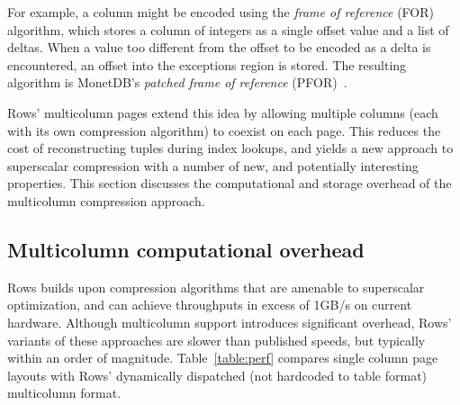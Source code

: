 \documentclass{sig-alternate-sigmod08}
\newcommand{\rows}{Rows\xspace}
\newcommand{\rowss}{Rows'\xspace}
\begin{document}
For example, a column might be encoded using the {\em frame of
  reference} (FOR) algorithm, which stores a column of integers as a
single offset value and a list of deltas.  When a value too different
from the offset to be encoded as a delta is encountered, an offset
into the exceptions region is stored.  The resulting algorithm is MonetDB's
 {\em patched frame of reference} (PFOR)~\cite{pfor}.

\rowss multicolumn pages extend this idea by allowing multiple columns
(each with its own compression algorithm) to coexist on each page.
This reduces the cost of reconstructing tuples during index lookups,
and yields a new approach to superscalar compression with a number of
new, and potentially interesting properties.  This section discusses
the computational and storage overhead of the multicolumn compression
approach.

\subsection{Multicolumn computational overhead}

\rows builds upon compression algorithms that are amenable to
superscalar optimization, and can achieve throughputs in excess of
1GB/s on current hardware.  Although multicolumn support introduces
significant overhead, \rowss variants of these approaches are slower
than published speeds, but typically within an order of magnitude.
Table~\ref{table:perf} compares single column page layouts with \rowss
dynamically dispatched (not hardcoded to table format) multicolumn
format.




\end{document}
